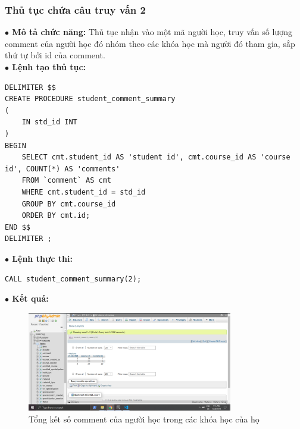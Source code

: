 \documentclass[12pt,a4paper,titlepage]{article}
\begin{document}
\subsubsection{Thủ tục chứa câu truy vấn 2}
\textbf{$\bullet$ Mô tả chức năng:} Thủ tục nhận vào một mã người học, truy vấn số lượng comment của người học đó nhóm theo các khóa học mà người đó tham gia, sắp thứ tự bởi id của comment.\\
\textbf{$\bullet$ Lệnh tạo thủ tục:}
\begin{lstlisting}
DELIMITER $$
CREATE PROCEDURE student_comment_summary
(
    IN std_id INT
)
BEGIN
	SELECT cmt.student_id AS 'student id', cmt.course_id AS 'course id', COUNT(*) AS 'comments' 
	FROM `comment` AS cmt
	WHERE cmt.student_id = std_id
    GROUP BY cmt.course_id
	ORDER BY cmt.id;
END $$
DELIMITER ;
\end{lstlisting}
\textbf{$\bullet$ Lệnh thực thi:}
\begin{lstlisting}
CALL student_comment_summary(2);
\end{lstlisting}
\textbf{$\bullet$ Kết quả:}
\begin{figure}[h!]
	\centering
	\caption{Tổng kết số comment của người học trong các khóa học của họ}
	\includegraphics[width=0.8\textwidth]{images/cmmt6.png}
\end{figure}
\end{document}
